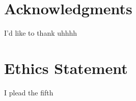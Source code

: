 \documentclass{article} %
\begin{document}
\section*{Acknowledgments}
I'd like to thank uhhhh

\section*{Ethics Statement}
I plead the fifth



%
%

\end{document}
